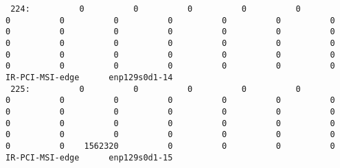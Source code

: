 \begin{lstlisting}
 224:          0          0          0          0          0          0          0          0          0          0          0          0          0          0          0          0          0          0          0          0          0          0          0          0          0          0          0          0          0          0          0          0          0          0          0          0          0          0          0          0  IR-PCI-MSI-edge      enp129s0d1-14
 225:          0          0          0          0          0          0          0          0          0          0          0          0          0          0          0          0          0          0          0          0          0          0          0          0          0          0          0          0          0          0          0          0          0          0          0    1562320          0          0          0          0  IR-PCI-MSI-edge      enp129s0d1-15
  
\end{lstlisting}  
